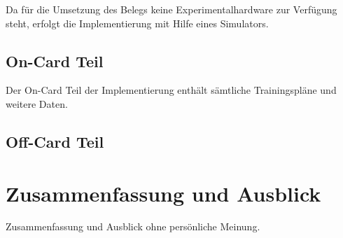 \documentclass[a4paper,12pt]{scrartcl}
\begin{document}

Da für die Umsetzung des Belegs keine Experimentalhardware zur Verfügung steht, erfolgt die Implementierung mit Hilfe eines Simulators.

\subsection{On-Card Teil}
\label{subsec:3.2}
Der On-Card Teil der Implementierung enthält sämtliche Trainingspläne und weitere Daten.



\subsection{Off-Card Teil}
\label{subsec:3.3}


\clearpage
\section{Zusammenfassung und Ausblick}
\label{sec:5}
Zusammenfassung und Ausblick ohne persönliche Meinung.

\clearpage
\end{document}
